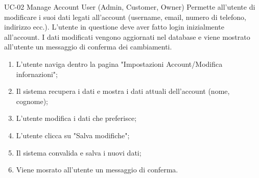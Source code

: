\usecasetable
{UC-02}
{Manage Account}
{User (Admin, Customer, Owner)}
{Permette all'utente di modificare i suoi dati legati all'account (username, email, numero di telefono, indirizzo ecc.).}
{L'utente in questione deve aver fatto login inizialmente all'account.}
{I dati modificati vengono aggiornati nel database e viene mostrato all'utente un messaggio di conferma dei cambiamenti.}
{
	\begin{enumerate}[nosep, leftmargin=*]
		\item[1.] L'utente naviga dentro la pagina "Impostazioni Account/Modifica infornazioni";
		\item[2.] Il sistema recupera i dati e mostra i dati attuali dell'account (nome, cognome);
		\item[3.] L'utente modifica i dati che preferisce;
		\item[4.] L'utente clicca su "Salva modifiche";
		\item[5.] Il sistema convalida e salva i nuovi dati;
		\item[6.] Viene mosrato all'utente un messaggio di conferma.
	\end{enumerate}
}
